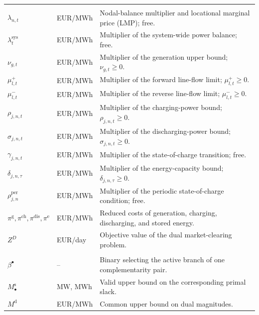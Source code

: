 \documentclass[11pt,a4paper,fleqn]{article}
\numberwithin{equation}{section}
\begin{document}
{\begin{longtable}{@{}>{\RaggedRight\arraybackslash}p{}
                       >{\RaggedRight\arraybackslash}p{}
                       >{\RaggedRight\arraybackslash}p{}@{}}
\addlinespace
\multicolumn{3}{@{}l}{\textit{Lower-level dual variables ($\Xi^{\mathrm{D}}$)}}\\
\addlinespace[0.3ex]
$\lambda_{n,t}$ & EUR/MWh & Nodal-balance multiplier and locational marginal price (LMP); free.\\
$\lambda_t^{\mathrm{sys}}$ & EUR/MWh & Multiplier of the system-wide power balance; free.\\
$\nu_{g,t}$ & EUR/MWh & Multiplier of the generation upper bound; $\nu_{g,t}\geq 0$.\\
$\mu^+_{l,t}$ & EUR/MWh & Multiplier of the forward line-flow limit; $\mu^+_{l,t}\geq 0$.\\
$\mu^-_{l,t}$ & EUR/MWh & Multiplier of the reverse line-flow limit; $\mu^-_{l,t}\geq 0$.\\
$\rho_{j,n,t}$ & EUR/MWh & Multiplier of the charging-power bound; $\rho_{j,n,t}\geq 0$.\\
$\sigma_{j,n,t}$ & EUR/MWh & Multiplier of the discharging-power bound; $\sigma_{j,n,t}\geq 0$.\\
$\gamma_{j,n,t}$ & EUR/MWh & Multiplier of the state-of-charge transition; free.\\
$\delta_{j,n,\tau}$ & EUR/MWh & Multiplier of the energy-capacity bound; $\delta_{j,n,\tau}\geq 0$.\\
$\rho^{\mathrm{per}}_{j,n}$ & EUR/MWh & Multiplier of the periodic state-of-charge condition; free.\\
$\pi^{\mathrm{g}},\pi^{\mathrm{ch}},\pi^{\mathrm{dis}},\pi^{\mathrm{e}}$ & EUR/MWh & Reduced costs of generation, charging, discharging, and stored energy.\\
$Z^D$ & EUR/day & Objective value of the dual market-clearing problem.\\

\addlinespace
\multicolumn{3}{@{}l}{\textit{Complementarity linearization}}\\
\addlinespace[0.3ex]
$\beta^{\bullet}$ & -- & Binary selecting the active branch of one complementarity pair.\\
$M^{\mathrm{s}}_{\bullet}$ & MW, MWh & Valid upper bound on the corresponding primal slack.\\
$M^{\mathrm{d}}$ & EUR/MWh & Common upper bound on dual magnitudes.\\


\end{longtable}}
\end{document}

